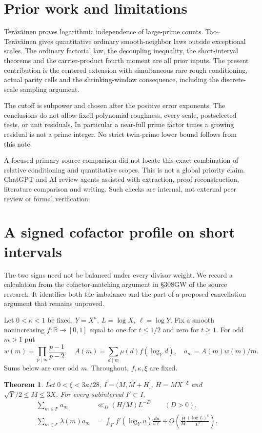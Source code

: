 \documentclass[11pt]{article}
\newtheorem{theorem}{Theorem}[section]
\theoremstyle{remark}\newtheorem{remark}[theorem]{Remark}
\begin{document}
\section{Prior work and limitations}
Ter\"av\"ainen \cite[Theorem 1.11]{ter} proves logarithmic independence
of large-prime counts. Tao--Ter\"av\"ainen \cite[Theorem 1.8]{tt} gives
quantitative ordinary smooth-neighbor laws outside exceptional scales.
The ordinary factorial law, the decoupling inequality, the short-interval
theorems and the carrier-product fourth moment are all prior inputs.
The present contribution is the centered extension with simultaneous
rare rough conditioning, actual parity cells and the shrinking-window
consequence, including the discrete-scale sampling argument.

The cutoff is subpower and chosen after the positive error exponents.
The conclusions do not allow fixed polynomial roughness, every scale,
postselected tests, or unit residuals. In particular a near-full prime
factor times a growing residual is not a prime integer. No strict
twin-prime lower bound follows from this note.

A focused primary-source comparison did not locate this exact combination
of relative conditioning and quantitative scopes. This is not a global
priority claim. ChatGPT and AI review agents assisted with extraction, proof
reconstruction, literature comparison and writing. Such checks are
internal, not external peer review or formal verification.



\section{A signed cofactor profile on short intervals}\label{sec:parity-transfer}
The two signs need not be balanced under every divisor weight. We
record a calculation from the cofactor-matching argument in
\S308GW of the source research. It identifies both the imbalance
and the part of a proposed cancellation argument that remains unproved.

Let \(0<\kappa<1\) be fixed, \(Y=X^\kappa,\ L=\log X,\ \ell=\log Y\).
Fix a smooth nonincreasing \(f:\mathbb R\to[0,1]\) equal to one for
\(t\le1/2\) and zero for \(t\ge1\). For odd \(m>1\) put
\[
 w(m)=\prod_{p\mid m}\frac{p-1}{p-2},\quad
 A(m)=\sum_{d\mid m}\mu(d)f(\log_Y d),\quad a_m=A(m)w(m)/m.
\]
Sums below are over odd \(m\). Throughout, \(f,\kappa,\xi\) are fixed.
\begin{theorem}\label{th:parityshort}
Let \(0<\xi<3\kappa/28\), \(I=(M,M+H]\), \(H=MX^{-\xi}\) and
\(\sqrt Y/2\le M\le3X\). For every subinterval \(I'\subset I\),
\begin{align}
 \sum_{m\in I'}a_m&\ll_D(H/M)L^{-D}\qquad(D>0),\label{eq:plainweight}\\
 \sum_{m\in I'}\lambda(m)a_m
 &=\int_{I'} f'(\log_Y u)\frac{du}{u\ell}
  +O\left(\frac HM\frac{(\log L)^6}{L^2}\right).\label{eq:twistedweight}
\end{align}
\end{theorem}
\end{document}
